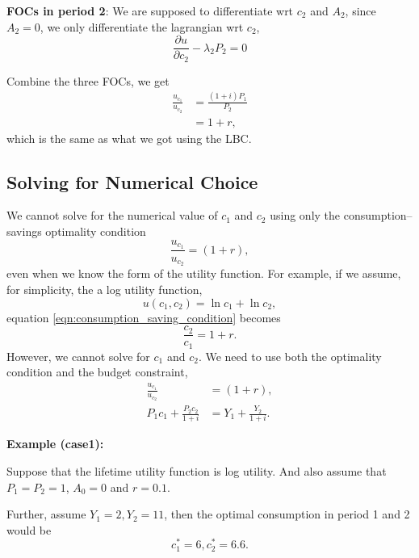 \documentclass[10pt]{article}
\begin{document}
{\textbf {FOCs in period 2}}:
We are supposed to differentiate wrt $ c_2 $ and $ A_2 $, since $ A_2 = 0 $, we only differentiate
the lagrangian wrt $ c_2 $,
\begin{equation*}
\frac{\partial u }{\partial c_2 }  - \lambda_2P_2 = 0
\end{equation*}

Combine the three FOCs, we get
\begin{align}
\frac{u_{c_1}}{u_{c_2}} &= \frac{(1 + i)P_1}{P_2}\\
&= 1 + r,
\end{align}
which is the same as what we got using the LBC.




\subsection{Solving for Numerical Choice}
We cannot solve for the numerical value of $ c_1 $ and $ c_2 $ using only the consumption--savings
optimality condition
\begin{equation}
\frac{u_{c_1}}{u_{c_2}} = (1 + r), \label{eqn:consumption_saving_condition}
\end{equation}
even when we know the form of the utility function. For example, if we assume, for simplicity, the
a log utility function, 
\begin{equation*}
u(c_1,c_2) = \ln c_1 + \ln c_2,
\end{equation*}
equation \eqref{eqn:consumption_saving_condition} becomes
\begin{equation*}
\frac{c_2}{c_1} = 1 + r.
\end{equation*}
However, we cannot solve for $ c_1 $ and $ c_2 $.
We need to use both the optimality condition and the budget constraint,
\begin{align*}
\frac{u_{c_1}}{u_{c_2}} &= (1 + r), \\
P_1c_1 + \frac{P_2c_2}{1 + i}&= Y_1 + \frac{Y_2}{1 + i}.
\end{align*}

{\textbf {Example (case1):}}

Suppose that the lifetime utility function is log utility. And also assume that $ P_1 = P_2 = 1 $,
$ A_0 = 0 $ and $ r = 0.1 $.

Further, assume $ Y_1 = 2, Y_2 = 11 $,
then the optimal consumption in period 1 and 2 would be
\begin{equation*}
c_1^{*} = 6, c_2^{*} = 6.6.
\end{equation*}
\end{document}
